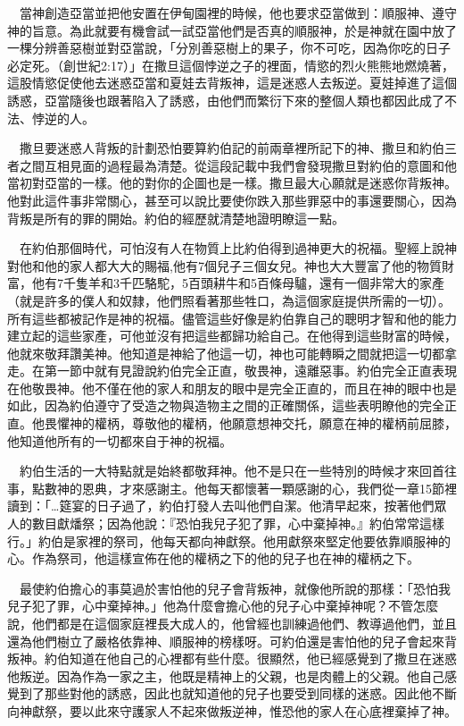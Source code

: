 \documentclass{book}
\begin{document}
　當神創造亞當並把他安置在伊甸園裡的時候，他也要求亞當做到：順服神、遵守神的旨意。為此就要有機會試一試亞當他們是否真的順服神，於是神就在園中放了一棵分辨善惡樹並對亞當說，「分別善惡樹上的果子，你不可吃，因為你吃的日子必定死。（創世紀2:17）」在撒旦這個悖逆之子的裡面，情慾的烈火熊熊地燃燒著，這股情慾促使他去迷惑亞當和夏娃去背叛神，這是迷惑人去叛逆。夏娃掉進了這個誘惑，亞當隨後也跟著陷入了誘惑，由他們而繁衍下來的整個人類也都因此成了不法、悖逆的人。

　撒旦要迷惑人背叛的計劃恐怕要算約伯記的前兩章裡所記下的神、撒旦和約伯三者之間互相見面的過程最為清楚。從這段記載中我們會發現撒旦對約伯的意圖和他當初對亞當的一樣。他的對你的企圖也是一樣。撒旦最大心願就是迷惑你背叛神。他對此這件事非常關心，甚至可以說比要使你跌入那些罪惡中的事還要關心，因為背叛是所有的罪的開始。約伯的經歷就清楚地證明瞭這一點。

　在約伯那個時代，可怕沒有人在物質上比約伯得到過神更大的祝福。聖經上說神對他和他的家人都大大的賜福,他有7個兒子三個女兒。神也大大豐富了他的物質財富，他有7千隻羊和3千匹駱駝，5百頭耕牛和5百條母驢，還有一個非常大的家產（就是許多的僕人和奴隸，他們照看著那些牲口，為這個家庭提供所需的一切）。所有這些都被記作是神的祝福。儘管這些好像是約伯靠自己的聰明才智和他的能力建立起的這些家產，可他並沒有把這些都歸功給自己。在他得到這些財富的時候，他就來敬拜讚美神。他知道是神給了他這一切，神也可能轉瞬之間就把這一切都拿走。在第一節中就有見證說約伯完全正直，敬畏神，遠離惡事。約伯完全正直表現在他敬畏神。他不僅在他的家人和朋友的眼中是完全正直的，而且在神的眼中也是如此，因為約伯遵守了受造之物與造物主之間的正確關係，這些表明瞭他的完全正直。他畏懼神的權柄，尊敬他的權柄，他願意想神交托，願意在神的權柄前屈膝，他知道他所有的一切都來自于神的祝福。

　約伯生活的一大特點就是始終都敬拜神。他不是只在一些特別的時候才來回首往事，點數神的恩典，才來感謝主。他每天都懷著一顆感謝的心，我們從一章15節裡讀到：「…筵宴的日子過了，約伯打發人去叫他們自潔。他清早起來，按著他們眾人的數目獻燔祭；因為他說：『恐怕我兒子犯了罪，心中棄掉神。』約伯常常這樣行。」約伯是家裡的祭司，他每天都向神獻祭。他用獻祭來堅定他要依靠順服神的心。作為祭司，他這樣宣佈在他的權柄之下的他的兒子也在神的權柄之下。

　最使約伯擔心的事莫過於害怕他的兒子會背叛神，就像他所說的那樣：「恐怕我兒子犯了罪，心中棄掉神。」他為什麼會擔心他的兒子心中棄掉神呢？不管怎麼說，他們都是在這個家庭裡長大成人的，他曾經也訓練過他們、教導過他們，並且還為他們樹立了嚴格依靠神、順服神的榜樣呀。可約伯還是害怕他的兒子會起來背叛神。約伯知道在他自己的心裡都有些什麼。很顯然，他已經感覺到了撒旦在迷惑他叛逆。因為作為一家之主，他既是精神上的父親，也是肉體上的父親。他自己感覺到了那些對他的誘惑，因此也就知道他的兒子也要受到同樣的迷惑。因此他不斷向神獻祭，要以此來守護家人不起來做叛逆神，惟恐他的家人在心底裡棄掉了神。
\end{document}
